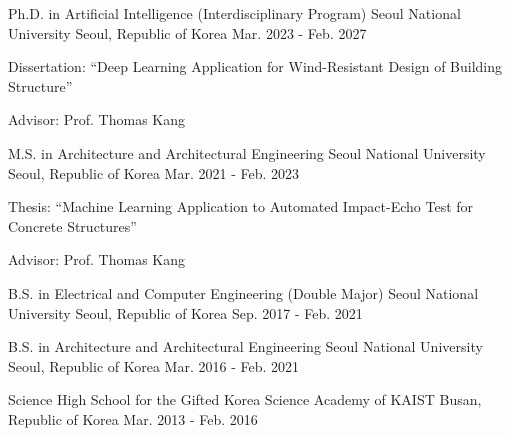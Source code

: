 

\begin{cventries}

  \cventrycompact
  {Ph.D. in Artificial Intelligence (Interdisciplinary Program)} %
  {Seoul National University} %
  {Seoul, Republic of Korea} %
  {Mar. 2023 - Feb. 2027} %
  {
    \begin{cvitems}
      \item {Dissertation: ``Deep Learning Application for Wind-Resistant Design of Building Structure''}
      \item {Advisor: Prof. Thomas Kang}
    \end{cvitems}
  }

  \cventrydivider

  \cventrycompact
  {M.S. in Architecture and Architectural Engineering} %
  {Seoul National University} %
  {Seoul, Republic of Korea} %
  {Mar. 2021 - Feb. 2023} %
  {
    \begin{cvitems}
      \item {Thesis: ``Machine Learning Application to Automated Impact-Echo Test for Concrete Structures''}
      \item {Advisor: Prof. Thomas Kang}
    \end{cvitems}
  }

  \cventrydivider

  \cventrycompact
  {B.S. in Electrical and Computer Engineering (Double Major)} %
  {Seoul National University} %
  {Seoul, Republic of Korea} %
  {Sep. 2017 - Feb. 2021} %
  {}

  \cventrydivider

  \cventrycompact
  {B.S. in Architecture and Architectural Engineering} %
  {Seoul National University} %
  {Seoul, Republic of Korea} %
  {Mar. 2016 - Feb. 2021} %
  {}

  \cventrydivider

  \cventrycompact
  {Science High School for the Gifted} %
  {Korea Science Academy of KAIST} %
  {Busan, Republic of Korea} %
  {Mar. 2013 - Feb. 2016} %
  {}

\end{cventries}
